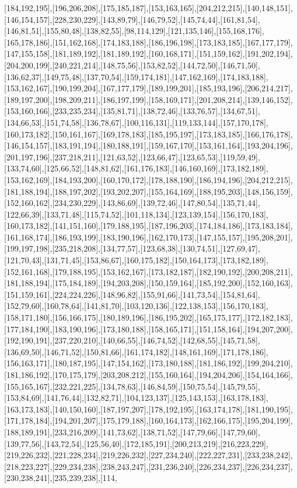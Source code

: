 [184,192,195],[196,206,208],[175,185,187],[153,163,165],[204,212,215],[140,148,151],[146,154,157],[228,230,229],[143,89,79],[146,79,52],[145,74,44],[161,81,54],[146,81,51],[155,80,48],[138,82,55],[98,114,129],[121,135,146],[155,168,176],[165,178,186],[151,162,168],[174,183,188],[186,196,198],[173,183,185],[167,177,179],[147,155,158],[181,189,192],[181,189,192],[160,168,171],[151,159,162],[191,202,194],[204,200,199],[240,221,214],[148,75,56],[153,82,52],[144,72,50],[146,71,50],[136,62,37],[149,75,48],[137,70,54],[159,174,181],[147,162,169],[174,183,188],[153,162,167],[190,199,204],[167,177,179],[189,199,201],[185,193,196],[206,214,217],[189,197,200],[198,209,211],[186,197,199],[158,169,171],[201,208,214],[139,146,152],[153,160,166],[233,235,234],[135,81,71],[138,72,46],[133,76,57],[134,67,51],[134,66,53],[151,74,58],[136,78,67],[100,116,131],[119,133,144],[157,170,178],[160,173,182],[150,161,167],[169,178,183],[185,195,197],[173,183,185],[166,176,178],[146,154,157],[183,191,194],[180,188,191],[159,167,170],[153,161,164],[193,204,196],[201,197,196],[237,218,211],[121,63,52],[123,66,47],[123,65,53],[119,59,49],[133,74,60],[125,66,52],[148,81,62],[161,176,183],[146,160,169],[173,182,189],[153,162,169],[184,193,200],[160,170,172],[178,188,190],[186,194,196],[204,212,215],[181,188,194],[188,197,202],[193,202,207],[155,164,169],[188,195,203],[148,156,159],[152,160,162],[234,230,229],[143,86,69],[139,72,46],[147,80,54],[135,71,44],[122,66,39],[133,71,48],[115,74,52],[101,118,134],[123,139,154],[156,170,183],[160,173,182],[141,151,160],[179,188,195],[187,196,203],[174,184,186],[173,183,184],[161,168,174],[186,193,199],[183,190,196],[162,170,173],[147,155,157],[195,208,201],[199,197,198],[235,218,208],[134,77,57],[123,68,38],[130,74,51],[127,69,47],[121,70,43],[131,71,45],[153,86,67],[160,175,182],[150,164,173],[173,182,189],[152,161,168],[179,188,195],[153,162,167],[173,182,187],[182,190,192],[200,208,211],[181,188,194],[175,184,189],[194,203,208],[150,159,164],[185,192,200],[152,160,163],[151,159,161],[224,224,226],[148,96,82],[155,91,66],[141,73,54],[154,81,64],[152,79,60],[160,78,64],[141,81,70],[103,120,136],[122,138,153],[156,170,183],[158,171,180],[156,166,175],[180,189,196],[186,195,202],[165,175,177],[172,182,183],[177,184,190],[183,190,196],[173,180,188],[158,165,171],[151,158,164],[194,207,200],[192,190,191],[237,220,210],[140,66,55],[146,74,52],[142,68,55],[145,71,58],[136,69,50],[146,71,52],[150,81,66],[161,174,182],[148,161,169],[171,178,186],[156,163,171],[180,187,195],[147,154,162],[173,180,188],[181,186,192],[199,204,210],[181,186,192],[170,175,179],[203,208,212],[155,160,164],[194,204,206],[154,164,166],[155,165,167],[232,221,225],[134,78,63],[146,84,59],[150,75,54],[145,79,55],[153,84,69],[141,76,44],[132,82,71],[104,123,137],[125,143,153],[163,178,183],[163,173,183],[140,150,160],[187,197,207],[178,192,195],[163,174,178],[181,190,195],[171,178,184],[194,201,207],[175,179,188],[160,164,173],[162,166,175],[195,204,199],[188,189,191],[233,216,209],[141,73,62],[138,71,52],[147,79,66],[147,79,60],[139,77,56],[143,72,54],[125,56,40],[172,185,191],[200,213,219],[216,223,229],[219,226,232],[221,228,234],[219,226,232],[227,234,240],[222,227,231],[233,238,242],[218,223,227],[229,234,238],[238,243,247],[231,236,240],[226,234,237],[226,234,237],[230,238,241],[235,239,238],[114,